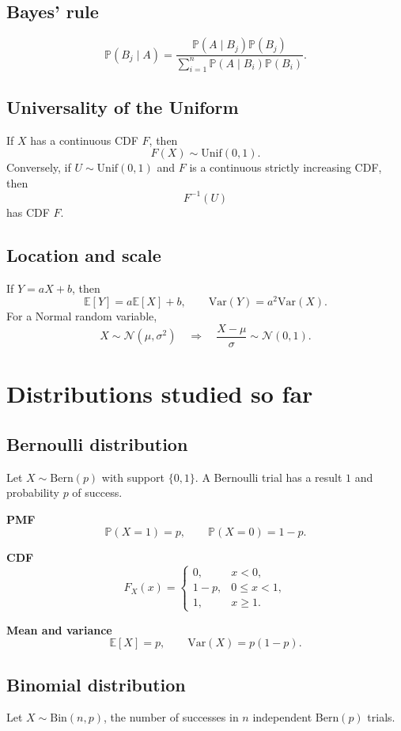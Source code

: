 \documentclass[11pt]{article}
\newcommand{\E}{\mathbb{E}}
\newcommand{\Var}{\mathrm{Var}}
\newcommand{\Prob}{\mathbb{P}}
\newcommand{\1}{\mathbf{1}}
\newcommand{\Bern}{\mathrm{Bern}}
\newcommand{\Bin}{\mathrm{Bin}}
\newcommand{\Unif}{\mathrm{Unif}}
\newcommand{\Normal}{\mathcal{N}}
\begin{document}
\subsection{Bayes' rule}
\[
    \Prob(B_j\mid A)=\frac{\Prob(A\mid B_j)\Prob(B_j)}{\sum_{i=1}^n \Prob(A\mid B_i)\Prob(B_i)}.
\]

\subsection{Universality of the Uniform}
If $X$ has a continuous CDF $F$, then
\[
    F(X) \sim \Unif(0,1).
\]
Conversely, if $U\sim \Unif(0,1)$ and $F$ is a continuous strictly increasing CDF, then
\[
    F^{-1}(U)
\]
has CDF $F$.

\subsection{Location and scale}
If $Y=aX+b$, then
\[
    \E[Y]=a\E[X]+b, \qquad \Var(Y)=a^2\Var(X).
\]
For a Normal random variable,
\[
    X\sim \Normal(\mu,\sigma^2)
    \quad \Longrightarrow \quad
    \frac{X-\mu}{\sigma} \sim \Normal(0,1).
\]

\section{Distributions studied so far}

\subsection{Bernoulli distribution}
Let $X\sim \Bern(p)$ with support $\{0,1\}$. A Bernoulli trial has a result $1$ and probability $p$ of success.

\textbf{PMF}
\[
    \Prob(X=1)=p, \qquad \Prob(X=0)=1-p.
\]

\textbf{CDF}
\[
    F_X(x)=
    \begin{cases}
        0, & x<0,\\
        1-p, & 0\le x<1,\\
        1, & x\ge 1.
    \end{cases}
\]

\textbf{Mean and variance}
\[
    \E[X]=p, \qquad \Var(X)=p(1-p).
\]

\subsection{Binomial distribution}
Let $X\sim \Bin(n,p)$, the number of successes in $n$ independent Bern$(p)$ trials.
\end{document}
